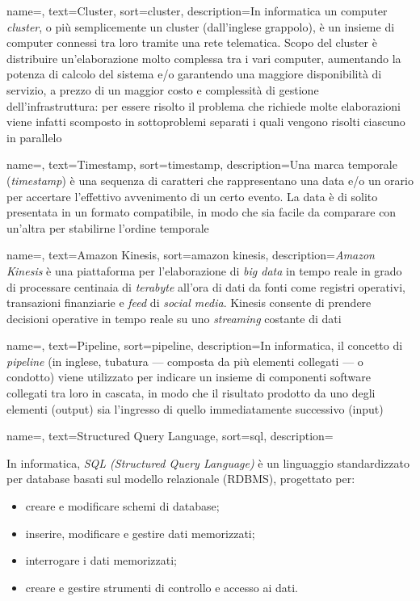 {
    name=,
    text=Cluster,
    sort=cluster,
    description={In informatica un computer \textit{cluster}, o più semplicemente un cluster (dall'inglese grappolo), è un insieme di computer connessi tra loro tramite una rete telematica. Scopo del cluster è distribuire un'elaborazione molto complessa tra i vari computer, aumentando la potenza di calcolo del sistema e/o garantendo una maggiore disponibilità di servizio, a prezzo di un maggior costo e complessità di gestione dell'infrastruttura: per essere risolto il problema che richiede molte elaborazioni viene infatti scomposto in sottoproblemi separati i quali vengono risolti ciascuno in parallelo}
}

{
    name=,
    text=Timestamp,
    sort=timestamp,
    description={Una marca temporale (\textit{timestamp}) è una sequenza di caratteri che rappresentano una data e/o un orario per accertare l'effettivo avvenimento di un certo evento. La data è di solito presentata in un formato compatibile, in modo che sia facile da comparare con un'altra per stabilirne l'ordine temporale}
}

{
    name=,
    text=Amazon Kinesis,
    sort=amazon kinesis,
    description={\textit{Amazon Kinesis} è una piattaforma per l'elaborazione di \textit{big data} in tempo reale in grado di processare centinaia di \textit{terabyte} all'ora di dati da fonti come registri operativi, transazioni finanziarie e \textit{feed} di \textit{social media}. Kinesis consente di prendere decisioni operative in tempo reale su uno \textit{streaming} costante di dati}
}

{
    name=,
    text=Pipeline,
    sort=pipeline,
    description={In informatica, il concetto di \textit{pipeline} (in inglese, tubatura — composta da più elementi collegati — o condotto) viene utilizzato per indicare un insieme di componenti software collegati tra loro in cascata, in modo che il risultato prodotto da uno degli elementi (output) sia l'ingresso di quello immediatamente successivo (input)}
}

{
    name=,
    text=Structured Query Language,
    sort=sql,
    description={In informatica, \textit{SQL (Structured Query Language)} è un linguaggio standardizzato per database basati sul modello relazionale (RDBMS), progettato per:
    \begin{itemize}
    	\item{creare e modificare schemi di database;}
    	\item{inserire, modificare e gestire dati memorizzati;}
    	\item{interrogare i dati memorizzati;}
    	\item{creare e gestire strumenti di controllo e accesso ai dati.}
    \end{itemize}
    }
}

